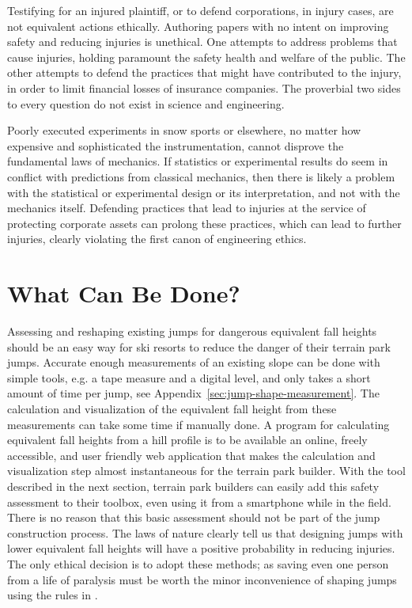 \documentclass{article}
\begin{document}
Testifying for an injured plaintiff, or to defend corporations, in injury
cases, are not equivalent actions ethically. Authoring papers with no intent on
improving safety and reducing injuries is unethical. One attempts to address
problems that cause injuries, holding paramount the safety health and welfare
of the public. The other attempts to defend the practices that might have
contributed to the injury, in order to limit financial losses of insurance
companies. The proverbial two sides to every question do not exist in science
and engineering.

Poorly executed experiments in snow sports or elsewhere, no matter how
expensive and sophisticated the instrumentation, cannot disprove the
fundamental laws of  mechanics. If statistics or experimental results do seem
in conflict with predictions from classical mechanics, then there is likely a
problem with the statistical or experimental design or its interpretation, and
not with the mechanics itself. Defending practices that lead to injuries at the
service of protecting corporate assets can prolong these practices, which can
lead to further injuries, clearly violating the first canon of engineering
ethics.

\section{What Can Be Done?}
%
Assessing and reshaping existing jumps for dangerous equivalent fall heights
should be an easy way for ski resorts to reduce the danger of their terrain
park jumps. Accurate enough measurements of an existing slope can be done with
simple tools, e.g. a tape measure and a digital level, and only takes a short
amount of time per jump, see Appendix~\ref{sec:jump-shape-measurement}.  The
calculation and visualization of the equivalent fall height from these
measurements can take some time if manually done. A program for calculating
equivalent  fall heights from a hill profile is to be available an online,
freely accessible, and user friendly web application that makes the calculation
and visualization step almost instantaneous for the terrain park builder. With
the tool described in the next section, terrain park builders can easily add
this safety assessment to their toolbox, even using it from a smartphone while
in the field. There is no reason that this basic assessment should not be part
of the jump construction process. The laws of nature clearly tell us that
designing jumps with lower equivalent fall heights will have a positive
probability in reducing injuries.  The only ethical decision is to adopt these
methods; as saving even one person from a life of paralysis must be worth the
minor inconvenience of shaping jumps using the rules in \cite{Levy2015}.
\end{document}
